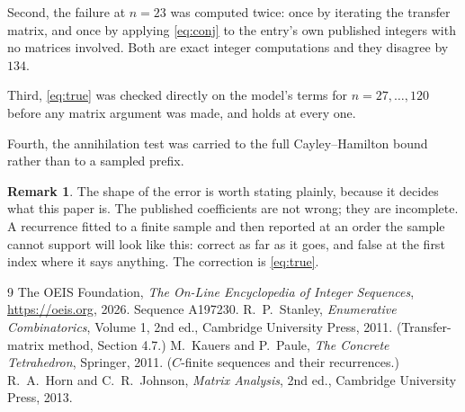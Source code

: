 \documentclass[11pt,a4paper]{article}
\theoremstyle{plain}
\theoremstyle{definition}
\newtheorem{remark}[theorem]{Remark}
\begin{document}
Second, the failure at $n=23$ was computed twice: once by iterating the transfer matrix, and
once by applying \eqref{eq:conj} to the entry's own published integers with no matrices
involved. Both are exact integer computations and they disagree by $134$.

Third, \eqref{eq:true} was checked directly on the model's terms for $n=27,\dots,120$
before any matrix argument was made, and holds at every one.

Fourth, the annihilation test was carried to the full Cayley--Hamilton bound rather than to a
sampled prefix.

\begin{remark}
The shape of the error is worth stating plainly, because it decides what this paper is. The
published coefficients are not wrong; they are incomplete. A recurrence fitted to a finite
sample and then reported at an order the sample cannot support will look like this: correct
as far as it goes, and false at the first index where it says anything. The correction is
\eqref{eq:true}.
\end{remark}

\begin{thebibliography}{9}
 The OEIS Foundation, \emph{The On-Line Encyclopedia of Integer
Sequences}, \url{https://oeis.org}, 2026. Sequence A197230.
 R.~P.~Stanley, \emph{Enumerative Combinatorics}, Volume 1, 2nd ed.,
Cambridge University Press, 2011. (Transfer-matrix method, Section 4.7.)
 M.~Kauers and P.~Paule, \emph{The Concrete Tetrahedron}, Springer, 2011.
($C$-finite sequences and their recurrences.)
 R.~A.~Horn and C.~R.~Johnson, \emph{Matrix Analysis}, 2nd ed., Cambridge
University Press, 2013.
\end{thebibliography}
\end{document}
